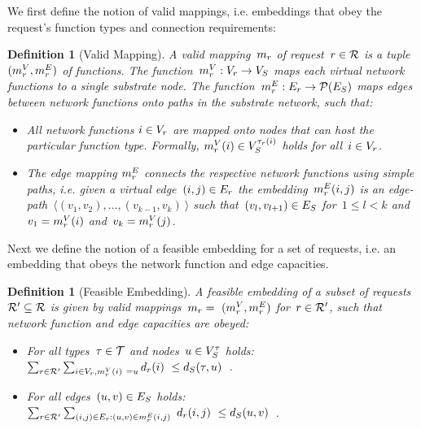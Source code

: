 \documentclass[10pt, conference, letterpaper]{IEEEtran}
\newtheorem{definition}[theorem]{Definition}
\begin{document}
We first define the notion of valid mappings, i.e. embeddings that obey the request's function types and connection requirements:

\begin{definition}[Valid Mapping]
\label{def:valid-mapping}
A valid mapping~$\map$ of request~$\req \in \requests$ is a tuple~$(\mapV, \mapE)$ of 
functions. The function~$\mapV : \VV \to \SV$ maps each virtual network functions to 
a single substrate node. The function~$\mapE : \VE \to \mathcal{P}(\SE)$ maps edges between network functions onto paths in the substrate network, such that:
\begin{itemize}
\item All network functions $i \in \VV$ are mapped onto nodes that can host the particular function type. Formally, $\mapV(i) \in  \SVTypes[\Vtype(i)]$ holds for all~$i \in \VV$.
\item The edge mapping $\mapE$ connects the respective network functions using simple paths, i.e. 
given a virtual edge~$(i,j) \in  \VE$ the embedding~$\mapE(i,j)$ is an edge-path~$\langle (v_1,v_2), \dots, (v_{k-1},v_k)~\rangle$ such that~$(v_l,v_{l+1}) \in  \SE$ for~$1 \leq l < k$ and~$v_1 = \mapV(i)$ and~$v_k = \mapV(j)$.
\end{itemize}
\end{definition}

Next we define the notion of a feasible embedding for a set of requests, i.e. an embedding that obeys the network function and edge capacities.

\begin{definition}[Feasible Embedding]
\label{def:feasible-embedding}
A feasible embedding of a subset of requests~$\requestsP \subseteq \requests$ is given by 
valid mappings~$\map =~(\mapV, \mapE)$ for~$\req \in \requestsP$, such that network function and edge capacities are obeyed:
\begin{itemize}
\item For all types~$\type \in \types$ and nodes~$u \in \SVTypes$ holds: 
$\sum_{\req \in \requestsP} \sum_{i \in \VV, \mapV(i)~= u} \Vcap(i)~\leq \Scap(\type, u)$~.\vspace{6pt}
\item For all edges~$(u,v) \in  \SE$ holds: \\$\sum_{\req \in \requestsP} \sum_{(i,j) \in  \VE: (u,v) \in  \mapE(i,j)~} \Vcap(i,j)~\leq \Scap(u,v)$~.
\end{itemize}
\end{definition}
\end{document}
